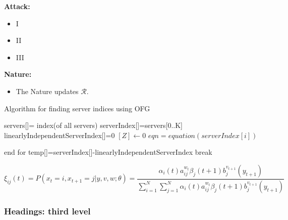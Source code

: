 \documentclass{article}
\begin{document}
\begin{algorithm}[tbh]
\begin{algorithmic}
 \State  
 \State \bf{Attack:} \normalfont 
    \begin{itemize}
        \item I
        \item II
        \item III
    \end{itemize}
 \State  
 \State \bf{Nature:} \normalfont 
    \begin{itemize}
        \item The Nature updates $\mathcal{R}$.
    \end{itemize}
  \State  
\EndWhile 
 \end{algorithmic}
\end{algorithm}

\begin{algorithm}
  \caption{Algorithm for finding server indices using OFG}

  \begin{algorithmic}
    \Statex {}
    \State servers[]= index(of all servers) 
    \State serverIndex[]=servers[0..K]
    \State linearlyIndependentServerIndex[]=0
    \State $[Z] \leftarrow 0$
    \Statex{} 
    \State        $eqn= equation(serverIndex[i])$ 
    \Statex{} 

    \EndFor end for 
    \Statex{}  
    \State temp[]=serverIndex[]-linearlyIndependentServerIndex 
    \State break
    \EndIf  
    \EndWhile  
  \end{algorithmic}
\end{algorithm}
  
\lipsum[5]
\begin{equation}
\xi _{ij}(t)=P(x_{t}=i,x_{t+1}=j|y,v,w;\theta)= {\frac {\alpha _{i}(t)a^{w_t}_{ij}\beta _{j}(t+1)b^{v_{t+1}}_{j}(y_{t+1})}{\sum _{i=1}^{N} \sum _{j=1}^{N} \alpha _{i}(t)a^{w_t}_{ij}\beta _{j}(t+1)b^{v_{t+1}}_{j}(y_{t+1})}}
\end{equation}

\subsubsection{Headings: third level}
\lipsum[6]
\end{document}
